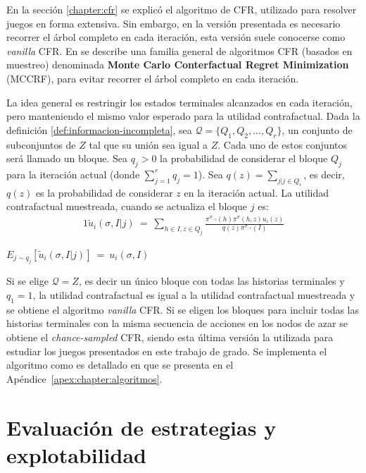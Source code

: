 En la sección \ref{chapter:cfr} se explicó el algoritmo de CFR, utilizado para resolver juegos en forma extensiva. Sin embargo, en la versión presentada es necesario recorrer el árbol completo en cada iteración, esta versión suele conocerse como \textit{vanilla} CFR. En \cite{bib:montecarlo-cfr} se describe una familia general de algoritmos CFR (basados en muestreo) denominada \textbf{Monte Carlo Conterfactual Regret Minimization} (MCCRF), para evitar recorrer el árbol completo en cada iteración.

La idea general es restringir los estados terminales alcanzados en cada iteración, pero manteniendo el mismo valor esperado para la utilidad contrafactual. Dada la definición \ref{def:informacion-incompleta}, sea $\mathcal{Q} = \{Q_1, Q_2, ..., Q_r\}$, un conjunto de subconjuntos de $Z$ tal que su unión sea igual a $Z$. Cada uno de estos conjuntos será llamado un bloque. Sea $q_j > 0$ la probabilidad de considerar el bloque $Q_j$ para la iteración actual (donde $\sum_{j = 1}^r {q_j} = 1$). 
Sea $q(z) = \sum_{j | j \in Q_i}$, es decir, $q(z)$ es la probabilidad de considerar $z$ en la iteración actual. La utilidad contrafactual muestreada, cuando se actualiza el bloque $j$ es:
\begin{alignat}{1}
\tilde{u}_i(\sigma, I | j)\ =\ \sum_{h \in I, z \in Q_j} \frac{\pi^{\sigma_{-i}}(h) \pi^{\sigma}(h, z) u_i(z)}{q(z) \pi^{\sigma_{-i}}(I)}
\end{alignat}

\begin{theorem}
$E_{j \sim q_j} [\tilde{u}_i(\sigma, I | j)]\ =\ u_i(\sigma, I)$
\end{theorem}

Si se elige $\mathcal{Q} = {Z}$, es decir un único bloque con todas las historias terminales y $q_1 = 1$, la utilidad contrafactual es igual a la utilidad contrafactual muestreada y se obtiene el algoritmo \textit{vanilla} CFR. Si se eligen los bloques para incluir todas las historias terminales con la misma secuencia de acciones en los nodos de azar se obtiene el \textit{chance-sampled} CFR, siendo esta última versión la utilizada para estudiar los juegos presentados en este trabajo de grado. Se implementa el algoritmo como es detallado en \cite{bib:introductionCFR} que se presenta en el Apéndice~\ref{apex:chapter:algoritmos}.


\section{Evaluación de estrategias y explotabilidad}

